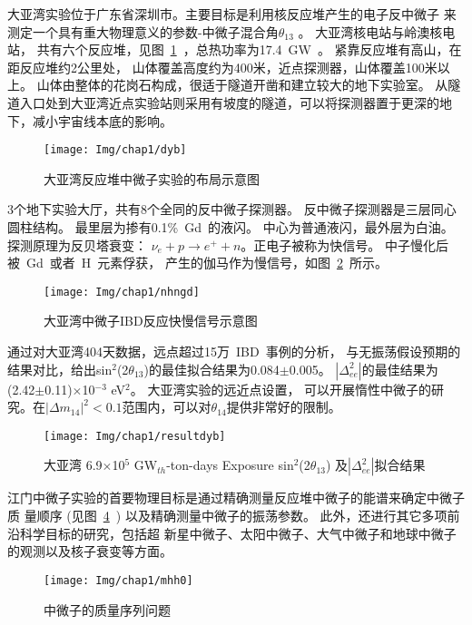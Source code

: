 大亚湾实验位于广东省深圳市。主要目标是利用核反应堆产生的电子反中微子
来测定一个具有重大物理意义的参数-中微子混合角$\theta_{13}$
\citep{pontecorvo1968neutrino,maki1962remarks}。
大亚湾核电站与岭澳核电站，
共有六个反应堆，见图~\ref{fig:dyb}~，总热功率为17.4~GW~。
紧靠反应堆有高山，在距反应堆约2公里处，
山体覆盖高度约为400米，近点探测器，山体覆盖100米以上。
山体由整体的花岗石构成，很适于隧道开凿和建立较大的地下实验室。
从隧道入口处到大亚湾近点实验站则采用有坡度的隧道，可以将探测器置于更深的地下，减小宇宙线本底的影响。
\begin{figure}[!htb]
  \centering
   \texttt{[image: Img/chap1/dyb]}
    \caption{大亚湾反应堆中微子实验的布局示意图}
  \label{fig:dyb}
\end{figure}
3个地下实验大厅，共有8个全同的反中微子探测器。
反中微子探测器是三层同心圆柱结构\citep{an2012side}。
最里层为掺有0.1\%~Gd~的液闪\citep{yeh2007gadolinium}。
中心为普通液闪，最外层为白油。探测原理为反贝塔衰变：
$\nu_e + p \rightarrow e^+ + n $。正电子被称为快信号。
中子慢化后被~Gd~\citep{an2015new}或者~H~元素\citep{an2014independent}俘获，
产生的伽马作为慢信号，如图~\ref{fig:nhngd}~所示。
\begin{figure}[!htb]
  \centering
   \texttt{[image: Img/chap1/nhngd]}
    \caption{大亚湾中微子IBD反应快慢信号示意图}
  \label{fig:nhngd}
\end{figure}
通过对大亚湾404天数据，远点超过15万~IBD~事例的分析，
与无振荡假设预期的结果对比，给出sin$^2$(2$\theta_{13}$)的最佳拟合结果为0.084$\pm$0.005。
$|\Delta^2_{ee}|$的最佳结果为 (2.42$\pm$0.11)$\times$10$^{-3}$ eV$^2$。
大亚湾实验的远近点设置，
可以开展惰性中微子的研究\citep{an2014search}。在${|\Delta m_{14}|}^2<0.1$范围内，可以对$\theta_{14}$提供非常好的限制。
\begin{figure}[!htb]
  \centering
   \texttt{[image: Img/chap1/resultdyb]}
    \caption{大亚湾 6.9$\times$10$^5$ GW$_{th}$-ton-days Exposure sin$^2$(2$\theta_{13}$) 及$|\Delta^2_{ee}|$拟合结果}
  \label{fig:resultdyb}
\end{figure}
江门中微子实验的首要物理目标是通过精确测量反应堆中微子的能谱来确定中微子质
量顺序\citep{magg1980neutrino} (见图~\ref{fig:mhh0}~) 以及精确测量中微子的振荡参数。
此外，还进行其它多项前沿科学目标的研究，包括超
新星中微子、太阳中微子、大气中微子和地球中微子的观测以及核子衰变等方面。
\begin{figure}[!htb]
  \centering
   \texttt{[image: Img/chap1/mhh0]}
    \caption{ 中微子的质量序列问题 }
  \label{fig:mhh0}
\end{figure}
